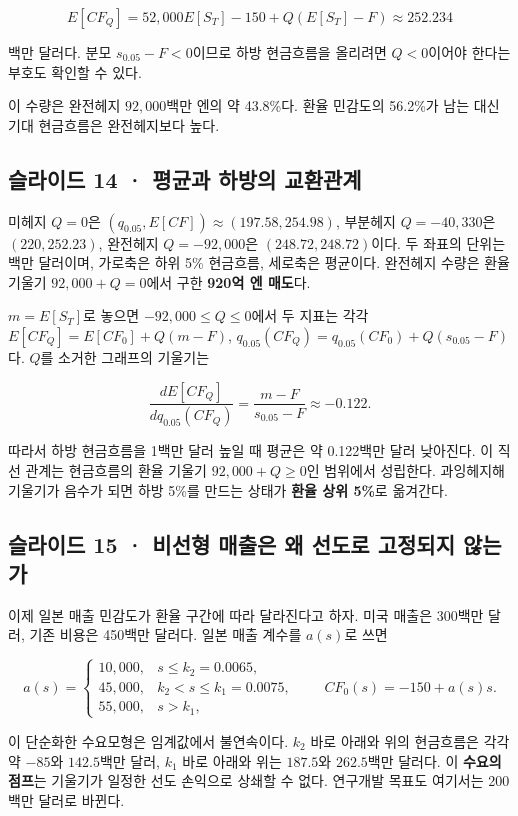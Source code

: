 \documentclass[11pt,a4paper]{article}
\begin{document}
\[
E[CF_Q]=52{,}000E[S_T]-150+Q(E[S_T]-F)\approx252.234
\]

백만 달러다. 분모 $s_{0.05}-F<0$이므로 하방 현금흐름을 올리려면 $Q<0$이어야 한다는 부호도 확인할 수 있다.\par

이 수량은 완전헤지 $92{,}000$백만 엔의 약 43.8\%다. 환율 민감도의 56.2\%가 남는 대신 기대 현금흐름은 완전헤지보다 높다.\par

\subsection{슬라이드 14 · 평균과 하방의 교환관계}
미헤지 $Q=0$은 $(q_{0.05},E[CF])\approx(197.58,254.98)$, 부분헤지 $Q=-40{,}330$은 $(220,252.23)$, 완전헤지 $Q=-92{,}000$은 $(248.72,248.72)$이다. 두 좌표의 단위는 백만 달러이며, 가로축은 하위 5\% 현금흐름, 세로축은 평균이다. 완전헤지 수량은 환율 기울기 $92{,}000+Q=0$에서 구한 \textbf{920억 엔 매도}다.\par

$m=E[S_T]$로 놓으면 $-92{,}000\leq Q\leq0$에서 두 지표는 각각 $E[CF_Q]=E[CF_0]+Q(m-F)$, $q_{0.05}(CF_Q)=q_{0.05}(CF_0)+Q(s_{0.05}-F)$다. $Q$를 소거한 그래프의 기울기는\par

\[
\frac{dE[CF_Q]}{dq_{0.05}(CF_Q)}=\frac{m-F}{s_{0.05}-F}\approx-0.122.
\]

따라서 하방 현금흐름을 1백만 달러 높일 때 평균은 약 0.122백만 달러 낮아진다. 이 직선 관계는 현금흐름의 환율 기울기 $92{,}000+Q\geq0$인 범위에서 성립한다. 과잉헤지해 기울기가 음수가 되면 하방 5\%를 만드는 상태가 \textbf{환율 상위 5\%}로 옮겨간다.\par

\subsection{슬라이드 15 · 비선형 매출은 왜 선도로 고정되지 않는가}
이제 일본 매출 민감도가 환율 구간에 따라 달라진다고 하자. 미국 매출은 300백만 달러, 기존 비용은 450백만 달러다. 일본 매출 계수를 $a(s)$로 쓰면\par

\[
a(s)=\begin{cases}
10{,}000,&s\leq k_2=0.0065,\\
45{,}000,&k_2<s\leq k_1=0.0075,\\
55{,}000,&s>k_1,
\end{cases}\qquad CF_0(s)=-150+a(s)s.
\]

이 단순화한 수요모형은 임계값에서 불연속이다. $k_2$ 바로 아래와 위의 현금흐름은 각각 약 $-85$와 $142.5$백만 달러, $k_1$ 바로 아래와 위는 $187.5$와 $262.5$백만 달러다. 이 \textbf{수요의 점프}는 기울기가 일정한 선도 손익으로 상쇄할 수 없다. 연구개발 목표도 여기서는 200백만 달러로 바뀐다.\par
\end{document}
